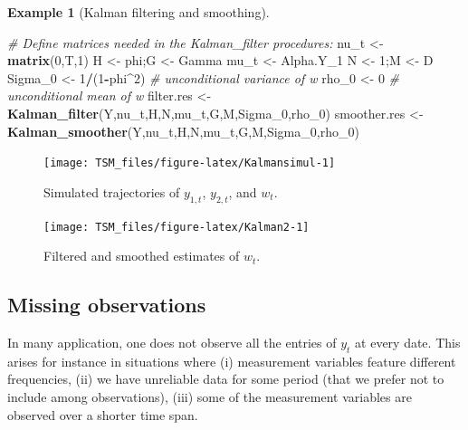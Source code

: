 \documentclass[
  12pt,
]{book}
\newenvironment{Shaded}{\begin{snugshade}}{\end{snugshade}}
\newcommand{\CommentTok}[1]{\textcolor[rgb]{0.56,0.35,0.01}{\textit{#1}}}
\newcommand{\DecValTok}[1]{\textcolor[rgb]{0.00,0.00,0.81}{#1}}
\newcommand{\FunctionTok}[1]{\textcolor[rgb]{0.13,0.29,0.53}{\textbf{#1}}}
\newcommand{\NormalTok}[1]{#1}
\newcommand{\OtherTok}[1]{\textcolor[rgb]{0.56,0.35,0.01}{#1}}
\newcommand{\SpecialCharTok}[1]{\textcolor[rgb]{0.81,0.36,0.00}{\textbf{#1}}}
\theoremstyle{definition}
\theoremstyle{definition}
\newtheorem{example}{Example}[chapter]
\theoremstyle{definition}
\theoremstyle{definition}
\theoremstyle{remark}
\begin{document}
\begin{example}[Kalman filtering and smoothing]
\begin{Shaded}
\begin{Highlighting}[]
\CommentTok{\# Define matrices needed in the Kalman\_filter procedures:}
\NormalTok{nu\_t }\OtherTok{\textless{}{-}} \FunctionTok{matrix}\NormalTok{(}\DecValTok{0}\NormalTok{,T,}\DecValTok{1}\NormalTok{)}
\NormalTok{H }\OtherTok{\textless{}{-}}\NormalTok{ phi;G }\OtherTok{\textless{}{-}}\NormalTok{ Gamma}
\NormalTok{mu\_t }\OtherTok{\textless{}{-}}\NormalTok{ Alpha.Y\_1}
\NormalTok{N }\OtherTok{\textless{}{-}} \DecValTok{1}\NormalTok{;M }\OtherTok{\textless{}{-}}\NormalTok{ D}
\NormalTok{Sigma\_0 }\OtherTok{\textless{}{-}} \DecValTok{1}\SpecialCharTok{/}\NormalTok{(}\DecValTok{1}\SpecialCharTok{{-}}\NormalTok{phi}\SpecialCharTok{\^{}}\DecValTok{2}\NormalTok{) }\CommentTok{\# unconditional variance of w}
\NormalTok{rho\_0 }\OtherTok{\textless{}{-}} \DecValTok{0} \CommentTok{\# unconditional mean of w}
\NormalTok{filter.res   }\OtherTok{\textless{}{-}} \FunctionTok{Kalman\_filter}\NormalTok{(Y,nu\_t,H,N,mu\_t,G,M,Sigma\_0,rho\_0)}
\NormalTok{smoother.res }\OtherTok{\textless{}{-}} \FunctionTok{Kalman\_smoother}\NormalTok{(Y,nu\_t,H,N,mu\_t,G,M,Sigma\_0,rho\_0)}
\end{Highlighting}
\end{Shaded}

\begin{figure}
\texttt{[image: TSM\_files/figure-latex/Kalmansimul-1]} \caption{Simulated trajectories of $y_{1,t}$, $y_{2,t}$, and $w_t$.}\label{fig:Kalmansimul}
\end{figure}

\begin{figure}
\texttt{[image: TSM\_files/figure-latex/Kalman2-1]} \caption{Filtered and smoothed estimates of $w_t$.}\label{fig:Kalman2}
\end{figure}

\end{example}

\hypertarget{missing-observations}{%
\subsection{Missing observations}\label{missing-observations}}

In many application, one does not observe all the entries of \(y_t\) at every date. This arises for instance in situations where (i) measurement variables feature different frequencies, (ii) we have unreliable data for some period (that we prefer not to include among observations), (iii) some of the measurement variables are observed over a shorter time span.
\end{document}
